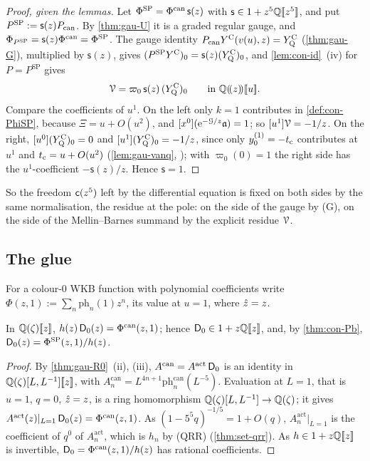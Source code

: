 \begin{proof}[Proof, given the lemmas]
Let $\Phi^{\mathrm{SP}}=\Phi^{\mathrm{can}}\,\mathsf s(z)$ with $\mathsf s\in1+z^5\mathbb{Q}[\![ z^5 ]\!]$, and put $P^{\mathrm{SP}}:=\mathsf s(z)P_{\mathrm{can}}$. By \cref{thm:gau-U} it is a graded regular gauge, and $\Phi_{P^{\mathrm{SP}}}=\mathsf s(z)\Phi^{\mathrm{can}}=\Phi^{\mathrm{SP}}$. The gauge identity $P_{\mathrm{can}}Y^{\mathrm{C}}(v(u),z)=Y^{\mathrm{C}}_{\mathrm{Q}}$ (\cref{thm:gau-G}), multiplied by $\mathsf s(z)$, gives $(P^{\mathrm{SP}}Y^{\mathrm{C}})_0=\mathsf s(z)(Y^{\mathrm{C}}_{\mathrm{Q}})_0$, and \cref{lem:con-id}~(iv) for $P=P^{\mathrm{SP}}$ gives
\[
\mathcal{V}=\varpi_0\,\mathsf s(z)\,(Y^{\mathrm{C}}_{\mathrm{Q}})_0\qquad\text{in }\mathbb{Q}(\!(z)\!)[\![ u ]\!] .
\]
Compare the coefficients of $u^1$. On the left only $k=1$ contributes in \cref{def:con-PhiSP}, because $\Xi=u+O(u^2)$, and $[x^0](\mathrm{e}^{-\mathcal{G}/z}\mathfrak{a})=1$; so $[u^1]\mathcal{V}=-1/z$. On the right, $[u^0](Y^{\mathrm{C}}_{\mathrm{Q}})_0=0$ and $[u^1](Y^{\mathrm{C}}_{\mathrm{Q}})_0=-1/z$, since only $y^{(1)}_0=-t_{\mathrm{c}}$ contributes at $u^1$ and $t_{\mathrm{c}}=u+O(u^2)$ (\cref{lem:gau-vanq}, ); with $\varpi_0(0)=1$ the right side has the $u^1$-coefficient $-\mathsf s(z)/z$. Hence $\mathsf s=1$.
\end{proof}

So the freedom $\mathsf{c}(z^5)$ left by the differential equation is fixed on both sides by the same normalisation, the residue at the pole: on the side of the gauge by (G), on the side of the Mellin--Barnes summand by the explicit residue $\mathcal{V}$.

\subsection{The glue}
\label{sec:con-glue}

For a colour-$0$ WKB function with polynomial coefficients write $\Phi(z,1):=\sum_n\mathrm{ph}_n(1)z^n$, its value at $u=1$, where $\hat{z}=z$.

\begin{thm}
\label{thm:con-glue}
In $\mathbb{Q}(\zeta)[\![ z ]\!]$, $h(z)\,\mathsf{D}_0(z)=\Phi^{\mathrm{can}}(z,1)$; hence $\mathsf{D}_0\in1+z\mathbb{Q}[\![ z ]\!]$, and, by \cref{thm:con-Pb}, $\mathsf{D}_0(z)=\Phi^{\mathrm{SP}}(z,1)/h(z)$.
\end{thm}

\begin{proof}
By \cref{thm:gau-R0}~(ii), (iii), $A^{\mathrm{can}}=A^{\mathrm{act}}\,\mathsf{D}_0$ is an identity in $\mathbb{Q}(\zeta)[L,L^{-1}][\![ z ]\!]$, with $A^{\mathrm{can}}_n=L^{4n+1}\mathrm{ph}^{\mathrm{can}}_n(L^{-5})$. Evaluation at $L=1$, that is $u=1$, $q=0$, $\hat{z}=z$, is a ring homomorphism $\mathbb{Q}(\zeta)[L,L^{-1}]\to\mathbb{Q}(\zeta)$; it gives $A^{\mathrm{act}}(z)|_{L=1}\,\mathsf{D}_0(z)=\Phi^{\mathrm{can}}(z,1)$. As $(1-5^5q)^{-1/5}=1+O(q)$, $A^{\mathrm{act}}_n|_{L=1}$ is the coefficient of $q^0$ of $A^{\mathrm{act}}_n$, which is $h_n$ by (QRR) (\cref{thm:set-qrr}). As $h\in1+z\mathbb{Q}[\![ z ]\!]$ is invertible, $\mathsf{D}_0=\Phi^{\mathrm{can}}(z,1)/h(z)$ has rational coefficients.
\end{proof}

